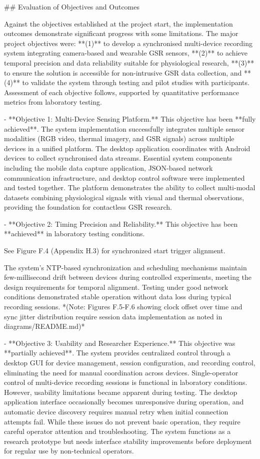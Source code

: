 \documentclass[12pt,a4paper]{article}
\begin{document}
{## Evaluation of Objectives and Outcomes

Against the objectives established at the project start, the implementation outcomes demonstrate significant progress with some limitations. The major project objectives were: **(1)** to develop a synchronised multi-device recording system integrating camera-based and wearable GSR sensors, **(2)** to achieve temporal precision and data reliability suitable for physiological research, **(3)** to ensure the solution is accessible for non-intrusive GSR data collection, and **(4)** to validate the system through testing and pilot studies with participants. Assessment of each objective follows, supported by quantitative performance metrics from laboratory testing.

- **Objective 1: Multi-Device Sensing Platform.** This objective has
  been **fully achieved**. The system implementation successfully
  integrates multiple sensor modalities (RGB video, thermal imagery,
  and GSR signals) across multiple devices in a unified platform. The
  desktop application coordinates with Android devices to collect
  synchronised data streams. Essential system components including the
  mobile data capture application, JSON-based network communication
  infrastructure, and desktop control software were implemented and
  tested together. The platform demonstrates the ability to collect
  multi-modal datasets combining physiological signals with visual and
  thermal observations, providing the foundation for contactless GSR
  research.

- **Objective 2: Timing Precision and Reliability.** This objective has
  been **achieved** in laboratory testing conditions. 

See Figure F.4 (Appendix H.3) for synchronized start trigger alignment.

  The system's NTP-based synchronization and scheduling mechanisms maintain 
  few-millisecond drift between devices during controlled experiments, 
  meeting the design requirements for temporal alignment. Testing under 
  good network conditions demonstrated stable operation without data loss 
  during typical recording sessions. *(Note: Figures F.5-F.6 showing clock 
  offset over time and sync jitter distribution require session data 
  implementation as noted in diagrams/README.md)*

- **Objective 3: Usability and Researcher Experience.** This objective
  was **partially achieved**. The system provides centralized control
  through a desktop GUI for device management, session configuration,
  and recording control, eliminating the need for manual coordination
  across devices. Single-operator control of multi-device recording
  sessions is functional in laboratory conditions. However, usability
  limitations became apparent during testing. The desktop application
  interface occasionally becomes unresponsive during operation, and
  automatic device discovery requires manual retry when initial
  connection attempts fail. While these issues do not prevent basic
  operation, they require careful operator attention and troubleshooting.
  The system functions as a research prototype but needs interface
  stability improvements before deployment for regular use by
  non-technical operators.

}
\end{document}
